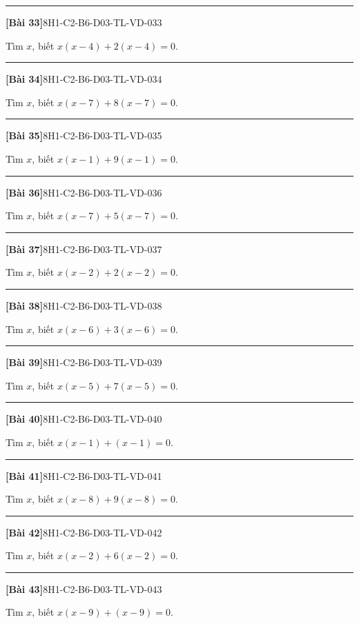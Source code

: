 \documentclass[12pt,a4paper]{article}
\newif\ifloigiai
\newenvironment{cauhoi}[2]{%
  \par\medskip\noindent\rule{\textwidth}{0.4pt}\par\nopagebreak
  \noindent\textbf{[#1]}\hfill{\scriptsize\ttfamily #2}\par\nopagebreak\smallskip}{\par}
\newcommand{\loigiai}[1]{\ifloigiai\par\smallskip\noindent\textit{Lời giải.} #1\par\fi}
\begin{document}
\begin{cauhoi}{Bài 33}{8H1-C2-B6-D03-TL-VD-033}
Tìm $x$, biết $x(x-4)+2(x-4)=0$.
\loigiai{Đặt nhân tử chung: $(x-4)(x+2)=0$. Suy ra $x=4$ hoặc $x=-2$.}
\end{cauhoi}
\begin{cauhoi}{Bài 34}{8H1-C2-B6-D03-TL-VD-034}
Tìm $x$, biết $x(x-7)+8(x-7)=0$.
\loigiai{Đặt nhân tử chung: $(x-7)(x+8)=0$. Suy ra $x=7$ hoặc $x=-8$.}
\end{cauhoi}
\begin{cauhoi}{Bài 35}{8H1-C2-B6-D03-TL-VD-035}
Tìm $x$, biết $x(x-1)+9(x-1)=0$.
\loigiai{Đặt nhân tử chung: $(x-1)(x+9)=0$. Suy ra $x=1$ hoặc $x=-9$.}
\end{cauhoi}
\begin{cauhoi}{Bài 36}{8H1-C2-B6-D03-TL-VD-036}
Tìm $x$, biết $x(x-7)+5(x-7)=0$.
\loigiai{Đặt nhân tử chung: $(x-7)(x+5)=0$. Suy ra $x=7$ hoặc $x=-5$.}
\end{cauhoi}
\begin{cauhoi}{Bài 37}{8H1-C2-B6-D03-TL-VD-037}
Tìm $x$, biết $x(x-2)+2(x-2)=0$.
\loigiai{Đặt nhân tử chung: $(x-2)(x+2)=0$. Suy ra $x=2$ hoặc $x=-2$.}
\end{cauhoi}
\begin{cauhoi}{Bài 38}{8H1-C2-B6-D03-TL-VD-038}
Tìm $x$, biết $x(x-6)+3(x-6)=0$.
\loigiai{Đặt nhân tử chung: $(x-6)(x+3)=0$. Suy ra $x=6$ hoặc $x=-3$.}
\end{cauhoi}
\begin{cauhoi}{Bài 39}{8H1-C2-B6-D03-TL-VD-039}
Tìm $x$, biết $x(x-5)+7(x-5)=0$.
\loigiai{Đặt nhân tử chung: $(x-5)(x+7)=0$. Suy ra $x=5$ hoặc $x=-7$.}
\end{cauhoi}
\begin{cauhoi}{Bài 40}{8H1-C2-B6-D03-TL-VD-040}
Tìm $x$, biết $x(x-1)+(x-1)=0$.
\loigiai{Đặt nhân tử chung: $(x-1)(x+1)=0$. Suy ra $x=1$ hoặc $x=-1$.}
\end{cauhoi}
\begin{cauhoi}{Bài 41}{8H1-C2-B6-D03-TL-VD-041}
Tìm $x$, biết $x(x-8)+9(x-8)=0$.
\loigiai{Đặt nhân tử chung: $(x-8)(x+9)=0$. Suy ra $x=8$ hoặc $x=-9$.}
\end{cauhoi}
\begin{cauhoi}{Bài 42}{8H1-C2-B6-D03-TL-VD-042}
Tìm $x$, biết $x(x-2)+6(x-2)=0$.
\loigiai{Đặt nhân tử chung: $(x-2)(x+6)=0$. Suy ra $x=2$ hoặc $x=-6$.}
\end{cauhoi}
\begin{cauhoi}{Bài 43}{8H1-C2-B6-D03-TL-VD-043}
Tìm $x$, biết $x(x-9)+(x-9)=0$.
\loigiai{Đặt nhân tử chung: $(x-9)(x+1)=0$. Suy ra $x=9$ hoặc $x=-1$.}
\end{cauhoi}
\end{document}
